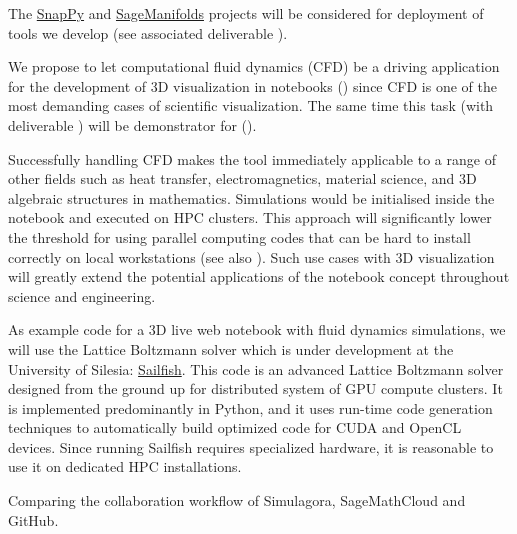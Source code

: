 \begin{workpackage}
\begin{tasklist}
\begin{task}[title=Visualization system for 3D data in web-notebook
,id=vis3d,lead=SR, partners={US,PS,USO}, PM=13, wphases=0-24]
The \href{http://www.math.uic.edu/t3m/SnapPy/}{SnapPy} and
\href{http://sagemanifolds.obspm.fr/}{SageManifolds} projects will be
considered for deployment of tools we develop (see associated
deliverable ).
\end{task}


\begin{task}[title=Visualization of 3D fluid dynamics data in web-notebook
,id=cfd-vis,lead=SR, partners={US,PS,USO},PM=5,wphases=12-36]

We propose to let computational fluid dynamics (CFD) be a driving
application for the development of 3D visualization in \Jupyter
notebooks () since CFD is one of the most demanding
cases of scientific visualization. The same time this task
(with deliverable ) will be
demonstrator for ().

Successfully handling CFD makes the tool immediately applicable to a
range of other fields such as heat transfer, electromagnetics,
material science, and 3D algebraic structures in
mathematics. Simulations would be initialised inside the notebook and
executed on HPC clusters. This approach will significantly lower the
threshold for using parallel computing codes that can be hard to
install correctly on local workstations (see also ). Such
use cases with 3D visualization will greatly extend the potential
applications of the \Jupyter notebook concept throughout science and
engineering.

As example code for a 3D live web notebook with fluid dynamics
simulations, we will use the Lattice Boltzmann solver which is under
development at the University of Silesia:
\href{http://sailfish.us.edu.pl/}{Sailfish}.  This code is an advanced
Lattice Boltzmann solver designed from the ground up for distributed
system of GPU compute clusters. It is implemented predominantly in
Python, and it uses run-time code generation techniques to
automatically build optimized code for CUDA and OpenCL devices. Since
running Sailfish requires specialized hardware, it is reasonable to
use it on dedicated HPC installations.
\end{task}

\begin{task}[id=simulagora,title=Simulagora collaboration,lead=LL,PM=2,wphases=0-12]
  Comparing the collaboration workflow of Simulagora, SageMathCloud and GitHub.
\end{task}


\end{tasklist}
\end{workpackage}
